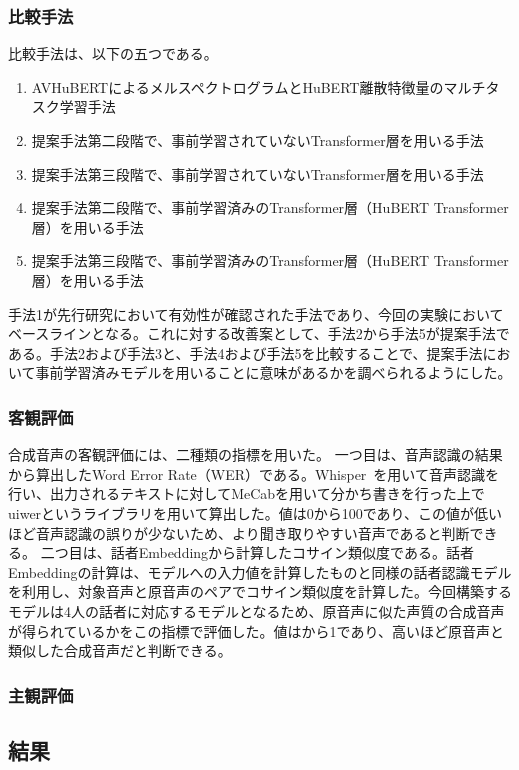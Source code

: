 \documentclass[12pt]{jarticle}
\numberwithin{equation}{section}    %
\numberwithin{figure}{section}      %
\numberwithin{table}{section}      %
\begin{document}
\subsubsection{比較手法}
比較手法は、以下の五つである。
\begin{enumerate}
    \item AVHuBERTによるメルスペクトログラムとHuBERT離散特徴量のマルチタスク学習手法
    \item 提案手法第二段階で、事前学習されていないTransformer層を用いる手法
    \item 提案手法第三段階で、事前学習されていないTransformer層を用いる手法
    \item 提案手法第二段階で、事前学習済みのTransformer層（HuBERT Transformer層）を用いる手法
    \item 提案手法第三段階で、事前学習済みのTransformer層（HuBERT Transformer層）を用いる手法
\end{enumerate}
手法1が先行研究において有効性が確認された手法であり、今回の実験においてベースラインとなる。これに対する改善案として、手法2から手法5が提案手法である。手法2および手法3と、手法4および手法5を比較することで、提案手法において事前学習済みモデルを用いることに意味があるかを調べられるようにした。

\subsubsection{客観評価}
合成音声の客観評価には、二種類の指標を用いた。
一つ目は、音声認識の結果から算出したWord Error Rate（WER）である。Whisper~\cite{radford2023robust}を用いて音声認識を行い、出力されるテキストに対してMeCabを用いて分かち書きを行った上でuiwerというライブラリを用いて算出した。値は0から100であり、この値が低いほど音声認識の誤りが少ないため、より聞き取りやすい音声であると判断できる。
二つ目は、話者Embeddingから計算したコサイン類似度である。話者Embeddingの計算は、モデルへの入力値を計算したものと同様の話者認識モデル\cite{wan2018generalized}を利用し、対象音声と原音声のペアでコサイン類似度を計算した。今回構築するモデルは4人の話者に対応するモデルとなるため、原音声に似た声質の合成音声が得られているかをこの指標で評価した。値はから1であり、高いほど原音声と類似した合成音声だと判断できる。

\subsubsection{主観評価}

\subsection{結果}
\end{document}
